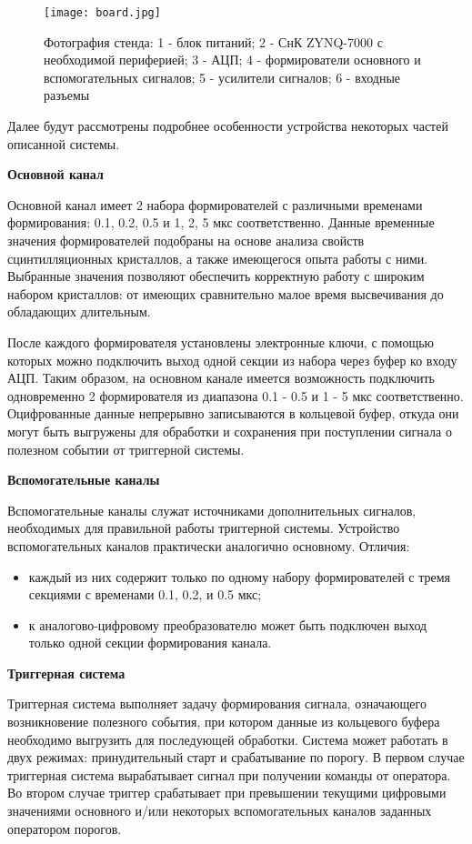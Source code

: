 \begin{figure}[ht]
    \centering
    \texttt{[image: board.jpg]}
    \caption{Фотография стенда: 1 - блок питаний; 2 - СнК ZYNQ-7000 с необходимой периферией; 3 - АЦП; 4 - формирователи основного и вспомогательных сигналов; 5 - усилители сигналов; 6 - входные разъемы}
    \label{fig:board}
\end{figure}
Далее будут рассмотрены подробнее особенности устройства некоторых частей описанной системы.\par
\textbf{Основной канал}\par
Основной канал имеет 2 набора формирователей с различными временами формирования: 0.1, 0.2, 0.5 и 1, 2, 5 мкс соответственно. Данные временные значения формирователей подобраны на основе анализа свойств сцинтилляционных кристаллов, а также имеющегося опыта работы с ними. Выбранные значения позволяют обеспечить корректную работу с широким набором кристаллов: от имеющих сравнительно малое время высвечивания до обладающих длительным.\par
После каждого формирователя установлены электронные ключи, с помощью которых можно подключить выход одной секции из набора через буфер ко входу АЦП. Таким образом, на основном канале имеется возможность подключить одновременно 2 формирователя из диапазона 0.1 - 0.5 и 1 - 5 мкс соответственно. Оцифрованные данные непрерывно записываются в кольцевой буфер, откуда они могут быть выгружены для обработки и сохранения при поступлении сигнала о полезном событии от триггерной системы.\par
\textbf{Вспомогательные каналы}\par
Вспомогательные каналы служат источниками дополнительных сигналов, необходимых для правильной работы триггерной системы. Устройство вспомогательных каналов практически аналогично основному. Отличия:\par
\begin{itemize}
    \item каждый из них содержит только по одному набору формирователей с тремя секциями с временами 0.1, 0.2, и 0.5 мкс;
    \item к аналогово-цифровому преобразователю может быть подключен выход только одной секции формирования канала.
\end{itemize}\par
\textbf{Триггерная система}\par
Триггерная система выполняет задачу формирования сигнала, означающего возникновение полезного события, при котором данные из кольцевого буфера необходимо выгрузить для последующей обработки. Система может работать в двух режимах: принудительный старт и срабатывание по порогу. В первом случае триггерная система вырабатывает сигнал при получении команды от оператора. Во втором случае триггер срабатывает при превышении текущими цифровыми значениями основного и/или некоторых вспомогательных каналов заданных оператором порогов.
